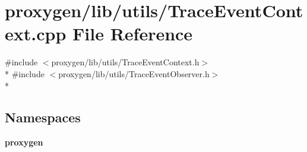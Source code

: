 \section{proxygen/lib/utils/\+Trace\+Event\+Context.cpp File Reference}
\label{TraceEventContext_8cpp}
{\ttfamily \#include $<$proxygen/lib/utils/\+Trace\+Event\+Context.\+h$>$}\\*
{\ttfamily \#include $<$proxygen/lib/utils/\+Trace\+Event\+Observer.\+h$>$}\\*
\subsection*{Namespaces}
\begin{DoxyCompactItemize}
\item 
 {\bf proxygen}
\end{DoxyCompactItemize}
